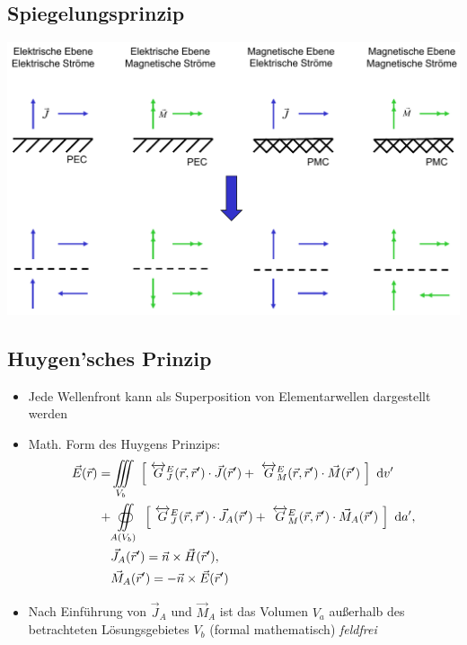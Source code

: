 {\subsection{Spiegelungsprinzip}
\includegraphics[width = 0.35\paperheight]{content/fuw/pictures/fuw_spiegelungsprinzip.png}
\subsection{Huygen'sches Prinzip}
\begin{itemize}
    \itemsep0pt
    \item Jede Wellenfront kann als Superposition von Elementarwellen dargestellt werden
    \item Math. Form des Huygens Prinzips:
        \begin{align*}
            \vec{E}(\vec{r}) = &\iiint\limits_{V_b}\
            \left[\
            \overleftrightarrow{G}^E_J(\vec{r},\vec{r}^\prime)\cdot\vec{J}(\vec{r}^\prime) +\
            \overleftrightarrow{G}^E_M(\vec{r},\vec{r}^\prime)\cdot\vec{M}(\vec{r}^\prime)\
            \right]\
            \mathrm{d}v^\prime\\
            + &\oiint\limits_{A(V_b)}\
            \left[\
            \overleftrightarrow{G}^E_J(\vec{r},\vec{r}^\prime)\cdot\vec{J}_A(\vec{r}^\prime) +\
            \overleftrightarrow{G}^E_M(\vec{r},\vec{r}^\prime)\cdot\vec{M}_A(\vec{r}^\prime)\
            \right]\
            \mathrm{d}a^\prime,\\
            &\vec{J}_A(\vec{r}^\prime) = \vec{n} \times \vec{H}(\vec{r}^\prime),\\
            &\vec{M}_A(\vec{r}^\prime) = -\vec{n} \times \vec{E}(\vec{r}^\prime)\\
        \end{align*}
    \item Nach Einführung von $\vec{J}_A$ und $\vec{M}_A$ ist das Volumen $V_a$ außerhalb des betrachteten Lösungsgebietes $V_b$ (formal mathematisch) \textit{feldfrei}
\end{itemize}
}
